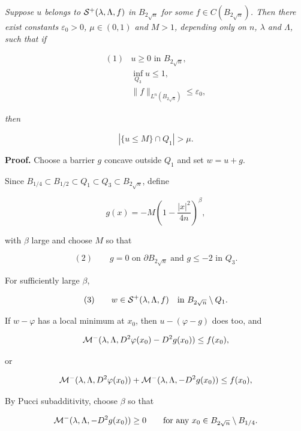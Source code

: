 \begin{lemma}\label{hanlin:ch05-lem-5-13} \emph{Suppose $u$ belongs to $\mathcal{S}^{+}(\lambda,\Lambda,f)$ in $B_{2\sqrt{n}}$ for some $f \in C(B_{2\sqrt{n}})$.
Then there exist constants $\varepsilon_{0} > 0$, $\mu \in (0,1)$ and $M > 1$, depending only on $n$, $\lambda$
and $\Lambda$, such that if}

\[
\begin{array}{ll}
(1) & u \geq 0 \text{ in } B_{2\sqrt{n}},\\
& \inf_{Q_{3}} u \leq 1,\\
& \|f\|_{L^{n}(B_{2\sqrt{n}})} \leq \varepsilon_{0},
\end{array}
\]

\emph{then}

\[
|\{u \leq M\} \cap Q_{1}| > \mu.
\]
\end{lemma}

\medskip


\noindent\textbf{Proof.} \sketch Choose a barrier $g$ concave outside $Q_1$ and set $w=u+g$.

Since $B_{1/4}\subset B_{1/2}\subset Q_1\subset Q_3\subset B_{2\sqrt n}$, define

\[
g(x)=-M\left(1-\frac{|x|^{2}}{4n}\right)^{\beta},
\]

with $\beta$ large and choose $M$ so that

\[
(2)\qquad g=0 \text{ on } \partial B_{2\sqrt{n}} \text{ and } g \leq -2 \text{ in } Q_{3}.
\]

For sufficiently large $\beta$,

\[
(3)\qquad w \in \mathcal{S}^{+}(\lambda,\Lambda,f) \quad \text{in } B_{2\sqrt{n}} \setminus Q_{1}.
\]

If $w-\varphi$ has a local minimum at $x_0$, then $u-(\varphi-g)$ does too, and

\[
\mathcal{M}^{-}(\lambda,\Lambda,D^{2}\varphi(x_{0})-D^{2}g(x_{0})) \leq f(x_{0}),
\]

or

\[
\mathcal{M}^{-}(\lambda,\Lambda,D^{2}\varphi(x_{0}))+\mathcal{M}^{-}(\lambda,\Lambda,-D^{2}g(x_{0})) \leq f(x_{0}),
\]

By Pucci subadditivity, choose $\beta$ so that

\[
\mathcal{M}^{-}(\lambda,\Lambda,-D^{2}g(x_{0})) \geq 0 \qquad \text{for any } x_{0} \in B_{2\sqrt{n}} \setminus B_{1/4}.
\]


